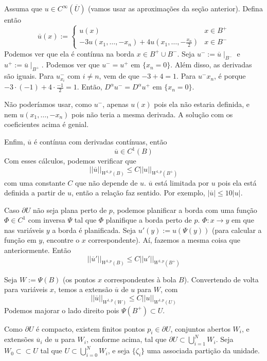 \documentclass[11pt]{article}
\newcommand{\pu}{\partial U}
\begin{document}
Assuma que \( u \in C^\infty (\overline{U}) \) (vamos usar as aproximações da seção anterior). Defina então \[ \overline{u}(x) := \begin{cases}
	u(x) & x \in B^+ \\
	-3u(x_1, \ldots, -x_n) + 4u(x_1, \ldots, -\frac{x_n}{2}) & x \in B^-
\end{cases} \] Podemos ver que ela é contínua na borda \( x \in B^+ \cup B^- \). Seja \( u^- := \overline{u}\mid_{B^-} \) e \( u^+ := \overline{u}\mid_{B^+} \).  Podemos ver que \( u^- = u^+ \) em \( \{x_n=0\}\). Além disso, as derivadas são iguais. Para \( u^-_{x_i} \) com \( i \neq n \), vem de que \( -3 + 4 = 1 \). Para \( u^-{x_n} \), é porque \( -3 \cdot (-1) + 4 \cdot \frac{-1}{2} = 1 \). Então, \( D^\alpha u^- = D^\alpha u^+ \) em \( \{x_n=0\} \).

Não poderíamos usar, como $ u^- $, apenas $ u(x) $ pois ela não estaria definida, e nem $ u(x_1,\ldots, -x_n) $ pois não teria a mesma derivada. A solução com os coeficientes acima é genial.


Enfim, $ \overline{u} $ é contínua com derivadas contínuas, então \[ \overline{u} \in C^1(B) \]
Com esses cálculos, podemos verificar que \[ ||\overline{u}||_{W^{1,p}(B)} \leq C ||u||_{W^{1,p}(B^+)} \] com uma constante \( C \) que não depende de \( u \). $\overline{u} $ está limitada por $u$ pois ela está definida a partir de $u$, então a relação faz sentido. Por exemplo, $|\overline{u}| \leq 10  |u| $.

Caso \( \pu \) não seja plana perto de \( p \), podemos planificar a borda com uma função \( \Phi \in C^1 \) com inversa \( \Psi \) tal que \( \Phi \) planifique a borda perto de \( p \).
\( \Phi: x \rightarrow y \) em que nas variáveis \( y \) a borda é planificada. Seja \( u'(y) := u(\Psi(y)) \) (para calcular a função em \( y \), encontre o \( x \) correspondente). Aí, fazemos a mesma coisa que anteriormente. Então \[ ||\overline{u}'||_{W^{1,p}(B)} \leq C ||u'||_{W^{1,p}(B^+)} \]

Seja \( W:= \Psi(B) \) (os pontos \( x \) correspondentes à bola \( B \)). Convertendo de volta para variáveis \( x \), temos a extensão \( \overline{u} \) de \( u \) para \( W \), com \[ ||\overline{u}||_{W^{1,p}(W)} \leq C ||u||_{W^{1,p}(U)} \] Podemos majorar o lado direito pois \( \Psi(B^+) \subset  U  \).

Como \( \pu \) é compacto, existem finitos pontos \( p_i \in \pu \), conjuntos abertos \( W_i \), e extensões \( \overline{u}_i \) de \( u \) para \( W_i \), conforme acima, tal que \( \pu \subset \bigcup_{i=1}^N W_i \). Seja \( W_0 \subset\subset U \) tal que \( U \subset \bigcup_{i=0}^N W_i \), e seja \( \{ \zeta_i \} \) uma associada partição da unidade.
\end{document}
